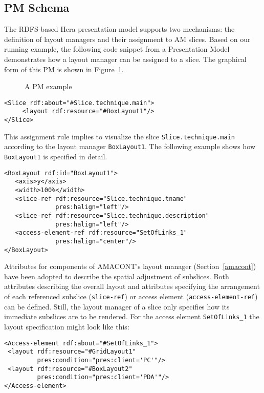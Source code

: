 \documentclass[oribibl]{llncs}
\begin{document}
\subsection{PM Schema}

The RDFS-based Hera presentation model supports two mechanisms: the definition of layout managers and their assignment to AM slices.
Based on our running example, the following code snippet from a Presentation Model demonstrates how a layout manager can be assigned to a slice.
The graphical form of this PM is shown in Figure~\ref{pm}.

\begin{figure}[h]
\centering
{}
\caption{A PM example}
\label{pm}
\end{figure}

{\small
\begin{verbatim}
<Slice rdf:about="#Slice.technique.main">
     <layout rdf:resource="#BoxLayout1"/>
</Slice>
\end{verbatim}
}

This assignment rule implies to visualize the slice \texttt{Slice.technique.main} according to the layout manager \texttt{BoxLayout1}.
The following example shows how \texttt{BoxLayout1} is specified in detail.

{\small
\begin{verbatim}
<BoxLayout rdf:id="BoxLayout1">
   <axis>y</axis>
   <width>100%</width>
   <slice-ref rdf:resource="Slice.technique.tname" 
              pres:halign="left"/>
   <slice-ref rdf:resource="Slice.technique.description" 
              pres:halign="left"/>
   <access-element-ref rdf:resource="SetOfLinks_1" 
              pres:halign="center"/>
</BoxLayout>
\end{verbatim}
}

Attributes for components of AMACONT's layout manager (Section~\ref{amacont}) have been adopted to describe the spatial adjustment of subslices.
Both attributes describing the overall layout and attributes specifying the arrangement of each referenced subslice (\texttt{slice-ref}) or access element (\texttt{access-element-ref}) can be defined.
Still, the layout manager of a slice only specifies how its immediate subslices are to be rendered.
For the access element \texttt{SetOfLinks\_1} the layout specification might 
look like this:

{\small
\begin{verbatim}
<Access-element rdf:about="#SetOfLinks_1">
 <layout rdf:resource="#GridLayout1" 
         pres:condition="pres:client='PC'"/>
 <layout rdf:resource="#BoxLayout2"  
         pres:condition="pres:client='PDA'"/>
</Access-element>\end{verbatim}
}
\end{document}
